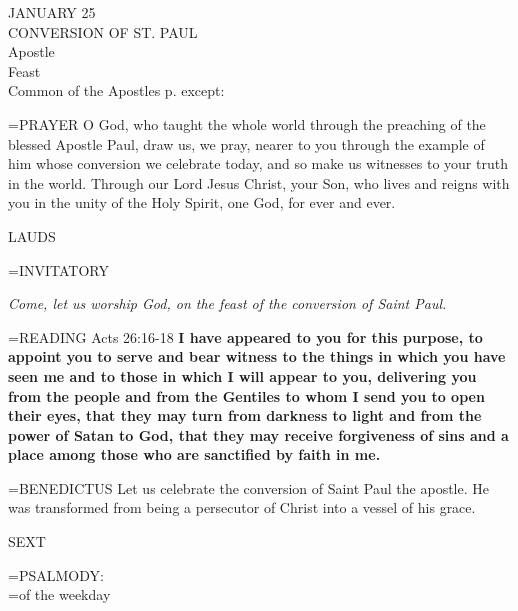 \begin{center}\normalsize JANUARY 25\\
\footnotesize CONVERSION OF ST. PAUL\\
\footnotesize Apostle\\
\footnotesize Feast\\
\footnotesize Common of the Apostles p.   except:\\
\end{center}

\hangindent=\parindent \small{PRAYER 
O God, who taught the whole world
through the preaching of the blessed Apostle Paul,
draw us, we pray, nearer to you
through the example of him whose conversion we celebrate today,
and so make us witnesses to your truth in the world.
Through our Lord Jesus Christ, your Son,
who lives and reigns with you in the unity of the Holy Spirit,
one God, for ever and ever.\\}
 
\begin{flushleft}\normalsize LAUDS\\\end{flushleft}

\hangindent=\parindent \small{INVITATORY}
\begin{center}
\textit{Come, let us worship God, on the feast of the conversion of Saint Paul.\\}
\end{center}

\hangindent=\parindent \small{READING} Acts 26:16-18 \textbf{I have appeared to you for this purpose, to
appoint you to serve and bear witness to the things in which you
have seen me and to those in which I will appear to you, delivering
you from the people and from the Gentiles to whom I send you
to open their eyes, that they may turn from darkness to light and
from the power of Satan to God, that they may receive forgiveness
of sins and a place among those who are sanctified by faith in me.\\}
 
\hangindent=\parindent \small{BENEDICTUS  Let us celebrate the conversion of Saint Paul the apostle.
He was transformed from being a persecutor of Christ into a vessel
of his grace.\\}
 
\begin{flushleft}\normalsize SEXT\\\end{flushleft}

\hangindent=\parindent \small{PSALMODY:}\\
\hangindent=\parindent  of the weekday\vspace{0.5em}

